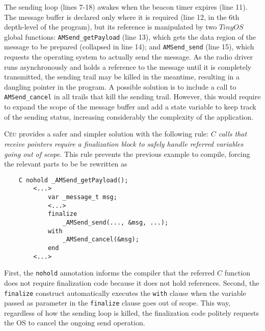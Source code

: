 \documentclass[10pt]{sensys-proc}
\newcommand{\CEU}{\textsc{C\'{e}u}\xspace}
\newcommand{\code}[1] {{\small{\texttt{#1}}}}
\begin{document}
The sending loop (lines 7-18) awakes when the beacon timer expires (line 11).
The message buffer is declared only where it is required (line 12, in the 6th 
depth-level of the program), but its reference is manipulated by two $TinyOS$ 
global functions:
\code{AMSend\_getPayload} (line 13), which gets the data region of the message 
to be prepared (collapsed in line 14);
and \code{AMSend\_send} (line 15), which requests the operating system to 
actually send the message.
As the radio driver runs asynchronously and holds a reference to the message 
until it is completely transmitted, the sending trail may be killed in the 
meantime, resulting in a dangling pointer in the program.
%
A possible solution is to include a call to \code{AMSend\_cancel} in all trails 
that kill the sending trail.
However, this would require to expand the scope of the message buffer and add a 
state variable to keep track of the sending status, increasing considerably the 
complexity of the application.

\CEU provides a safer and simpler solution with the following rule:
\emph{$C$ calls that receive pointers require a finalization block to safely 
handle referred variables going out of scope}.
This rule prevents the previous example to compile, forcing the relevant parts 
to be be rewritten as

{\small
\begin{verbatim}
    C nohold _AMSend_getPayload();
        <...>
            var _message_t msg;
            <...>
            finalize
                _AMSend_send(..., &msg, ...);
            with
                _AMSend_cancel(&msg);
            end
        <...>
\end{verbatim}
}

First, the \code{nohold} annotation informs the compiler that the referred $C$ 
function does not require finalization code because it does not hold 
references.
Second, the \code{finalize} construct automatically executes the \code{with} 
clause when the variable passed as parameter in the \code{finalize} clause goes 
out of scope.
This way, regardless of how the sending loop is killed, the finalization code 
politely requests the OS to cancel the ongoing send operation.
\end{document}
